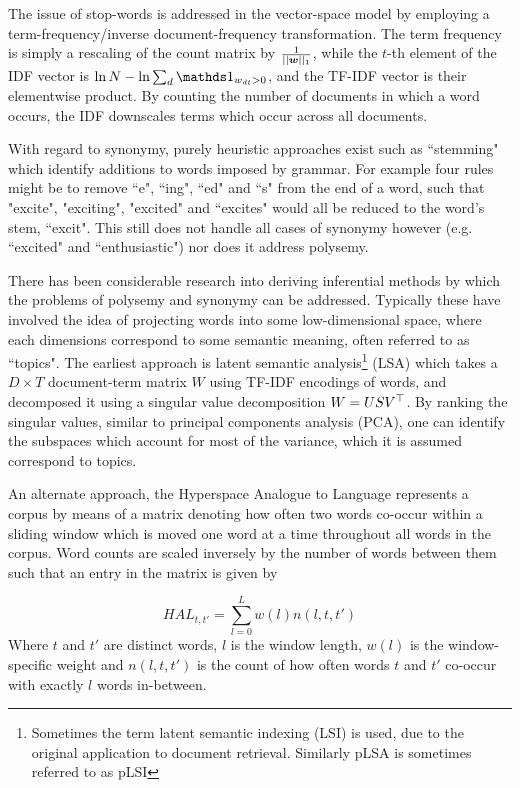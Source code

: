 The issue of stop-words is addressed in the vector-space model by employing a term-frequency/inverse document-frequency transformation. The term frequency is simply a rescaling of the count matrix by $\frac{1}{||\bm w||_1}$, while the $t$-th element of the IDF vector is $\ln N - \ln \sum_d \one_{w_{dt} > 0}$, and the TF-IDF vector is their elementwise product. By counting the number of documents in which a word occurs, the IDF downscales terms which occur across all documents. 

With regard to synonymy, purely heuristic approaches exist such as ``stemming" which identify additions to words imposed by grammar. For example four rules might be to remove ``e", ``ing", ``ed" and ``s" from the end of a word, such that "excite", "exciting", "excited" and ``excites" would all be reduced to the word's stem, ``excit". This still does not handle all cases of synonymy however (e.g. ``excited" and ``enthusiastic") nor does it address polysemy.

There has been considerable research into deriving inferential methods by which the problems of polysemy and synonymy can be addressed. Typically these have involved the idea of projecting words into some low-dimensional space, where each dimensions correspond to some semantic meaning, often referred to as ``topics". The earliest approach is latent semantic analysis\footnote{Sometimes the term latent semantic indexing (LSI) is used, due to the original application to document retrieval. Similarly pLSA is sometimes referred to as pLSI} (LSA)\cite{Deerwester1990} which takes a $D\times T$ document-term matrix $W$ using TF-IDF encodings of words, and decomposed it using a singular value decomposition $W = USV^\top$. By ranking the singular values, similar to principal components analysis (PCA), one can identify the subspaces which account for most of the variance, which it is assumed correspond to topics.

An alternate approach, the Hyperspace Analogue to Language\cite{Lund1996} represents a corpus by means of a matrix denoting how often two words co-occur within a sliding window which is moved one word at a time throughout all words in the corpus. Word counts are scaled inversely by the number of words between them such that an entry in the matrix is given by 

\begin{equation*}
HAL_{t,t'} = \sum_{l=0}^L w(l) n(l, t, t')
\end{equation*}
Where $t$ and $t'$ are distinct words, $l$ is the window length, $w(l)$ is the window-specific weight and $n(l, t, t')$ is the count of how often words $t$ and $t'$ co-occur with exactly $l$ words in-between.

